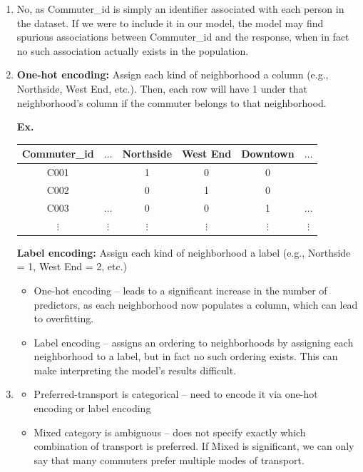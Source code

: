 \documentclass{article}
\begin{document}
\begin{enumerate}
    \item No, as Commuter\_id is simply an identifier associated with each person in the dataset. If we were to include it in our model, the model may find spurious associations between Commuter\_id and the response, when in fact no such association actually exists in the population.

    \item \textbf{One-hot encoding:} Assign each kind of neighborhood a column (e.g., Northside, West End, etc.). Then, each row will have 1 under that neighborhood's column if the commuter belongs to that neighborhood.

    \textbf{Ex.}
    \begin{center}
    \begin{tabular}{c|c|c|c|c|c}
        Commuter\_id & $\ldots$ & Northside & West End & Downtown & $\ldots$ \\
        \hline
        C001 & & 1 & 0 & 0 & \\
        C002 & & 0 & 1 & 0 & \\
        C003 & $\ldots$ & 0 & 0 & 1 & $\ldots$ \\
        $\vdots$ & $\vdots$ & $\vdots$ & $\vdots$ & $\vdots$ & $\vdots$ \\
    \end{tabular}
    \end{center}

    \textbf{Label encoding:} Assign each kind of neighborhood a label (e.g., Northside = 1, West End = 2, etc.)

    \begin{itemize}
        \item One-hot encoding -- leads to a significant increase in the number of predictors, as each neighborhood now populates a column, which can lead to overfitting.
        \item Label encoding -- assigns an ordering to neighborhoods by assigning each neighborhood to a label, but in fact no such ordering exists. This can make interpreting the model's results difficult.
    \end{itemize}

    \item
    \begin{itemize}
        \item Preferred-transport is categorical -- need to encode it via one-hot encoding or label encoding
        \item Mixed category is ambiguous -- does not specify exactly which combination of transport is preferred. If Mixed is significant, we can only say that many commuters prefer multiple modes of transport.
    \end{itemize}


\end{enumerate}
\end{document}
